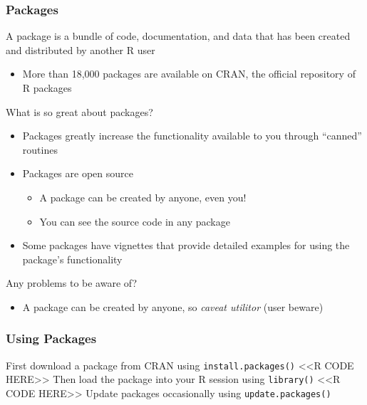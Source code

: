 \documentclass{beamer}
\begin{document}
\begin{frame}\frametitle{Packages}
    A package is a bundle of code, documentation, and data that has been created and distributed by another R user
    \begin{itemize}
        \item More than 18,000 packages are available on CRAN, the official repository of R packages 
    \end{itemize}
    \vspace{2ex}
    What is so great about packages?
    \begin{itemize}
        \item Packages greatly increase the functionality available to you through ``canned'' routines
        \item Packages are open source
        \begin{itemize}
            \item A package can be created by anyone, even you!
            \item You can see the source code in any package
        \end{itemize}
        \item Some packages have vignettes that provide detailed examples for using the package's functionality
    \end{itemize}
    \vspace{2ex}
    Any problems to be aware of?
    \begin{itemize}
        \item A package can be created by anyone, so \emph{caveat utilitor} (user beware)
    \end{itemize}
\end{frame}

\begin{frame}[fragile]\frametitle{Using Packages}
    First download a package from CRAN using \texttt{install.packages()}
    <<R CODE HERE>>
    \vspace{3ex}
    Then load the package into your R session using \texttt{library()}
    <<R CODE HERE>>
    \vspace{3ex}
    Update packages occasionally using \texttt{update.packages()}
\end{frame}
\end{document}
